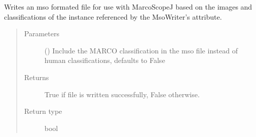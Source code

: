 \documentclass[letterpaper,10pt,english]{sphinxmanual}
\begin{document}
\begin{fulllineitems}
\begin{fulllineitems}
\label{\detokenize{polo.utils:polo.utils.io_utils.MsoWriter.write_mso_file}}
Writes an mso formated file for use with MarcoScopeJ based on
the images and classifications of the  instance
referenced by the MsoWriter’s 
attribute.
\begin{quote}\begin{description}
\item[{Parameters}] \leavevmode
{} (\sphinxstyleliteralemphasis{\sphinxupquote{, }}) \textendash{} Include the MARCO classification
in the mso file instead of human
classifications, defaults to False

\item[{Returns}] \leavevmode
True if file is written successfully, False otherwise.

\item[{Return type}] \leavevmode
bool

\end{description}\end{quote}

\end{fulllineitems}


\end{fulllineitems}

\end{document}

